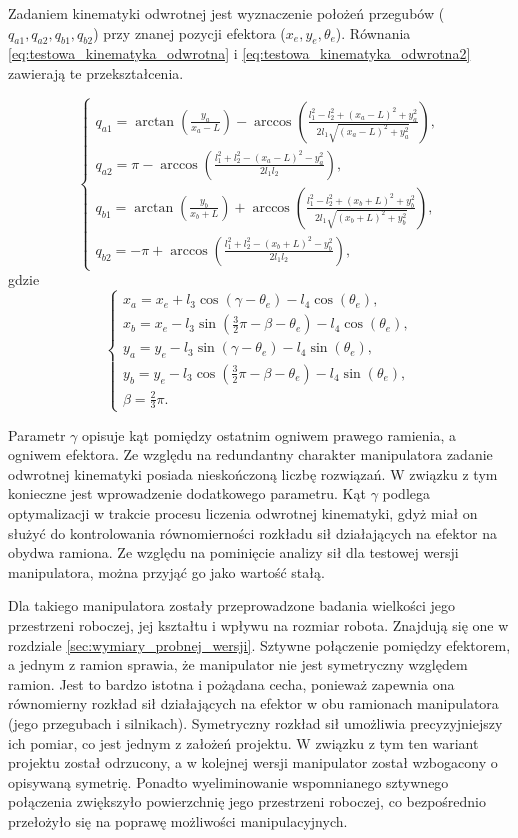\documentclass[printmode]{mgr}
\begin{document}
Zadaniem kinematyki odwrotnej jest wyznaczenie położeń przegubów ($q_{a1}, q_{a2}, q_{b1}, q_{b2}$) przy znanej pozycji efektora
($x_e, y_e, \theta_e$). Równania \ref{eq:testowa_kinematyka_odwrotna} i \ref{eq:testowa_kinematyka_odwrotna2} zawierają te przekształcenia.

\begin{equation}
\begin{cases}
q_{a1} = \arctan(\frac{y_a}{x_a-L})-\arccos(\frac{l_1^2-l_2^2+(x_a-L)^2+y_a^2}{2l_1\sqrt{(x_a-L)^2+y_a^2}}),\\
q_{a2} = \pi - \arccos(\frac{l_1^2+l_2^2-(x_a-L)^2-y_a^2}{2l_1l_2}),\\
q_{b1} = \arctan(\frac{y_b}{x_b+L}) + \arccos(\frac{l_1^2-l_2^2+(x_b+L)^2+y_b^2}{2l_1\sqrt{(x_b+L)^2+y_b^2}}),\\
q_{b2} = -\pi + \arccos(\frac{l_1^2+l_2^2-(x_b+L)^2-y_b^2}{2l_1l_2}),
\end{cases}
\label{eq:testowa_kinematyka_odwrotna}
\end{equation}
gdzie
\begin{equation}
\begin{cases}
x_a = x_e + l_3\cos(\gamma - \theta_e) - l_4\cos(\theta_e),\\
x_b = x_e - l_3\sin(\frac{3}{2}\pi - \beta - \theta_e) - l_4\cos(\theta_e),\\
y_a = y_e - l_3\sin(\gamma - \theta_e) - l_4\sin(\theta_e),\\
y_b = y_e - l_3\cos(\frac{3}{2}\pi - \beta - \theta_e) - l_4\sin(\theta_e),\\
\beta = \frac{2}{3}\pi.
\end{cases}
\label{eq:testowa_kinematyka_odwrotna2}
\end{equation}

Parametr $\gamma$ opisuje kąt pomiędzy ostatnim ogniwem prawego ramienia, a ogniwem efektora. Ze względu na redundantny charakter manipulatora
zadanie odwrotnej kinematyki posiada nieskończoną liczbę rozwiązań. W związku z tym konieczne jest wprowadzenie dodatkowego parametru.
Kąt $\gamma$ podlega optymalizacji w trakcie procesu liczenia odwrotnej kinematyki, gdyż miał on służyć do kontrolowania równomierności
rozkładu sił działających na efektor na obydwa ramiona. Ze względu na pominięcie analizy sił dla testowej wersji manipulatora, można
przyjąć go jako wartość stałą.

Dla takiego manipulatora zostały przeprowadzone badania wielkości jego przestrzeni roboczej, jej kształtu i wpływu na rozmiar robota.
Znajdują się one w rozdziale \ref{sec:wymiary_probnej_wersji}. 
Sztywne połączenie pomiędzy efektorem, a jednym z ramion sprawia, że manipulator nie jest symetryczny względem ramion. Jest to bardzo
istotna i pożądana cecha, ponieważ zapewnia ona równomierny rozkład sił działających na efektor w obu ramionach manipulatora
(jego przegubach i silnikach). Symetryczny rozkład sił umożliwia precyzyjniejszy ich pomiar, co jest jednym z założeń projektu. 
W związku z tym ten wariant projektu został odrzucony, a w kolejnej wersji manipulator został wzbogacony o opisywaną symetrię. 
Ponadto wyeliminowanie wspomnianego sztywnego połączenia zwiększyło powierzchnię jego przestrzeni roboczej, co bezpośrednio przełożyło
się na poprawę możliwości manipulacyjnych.
\end{document}
